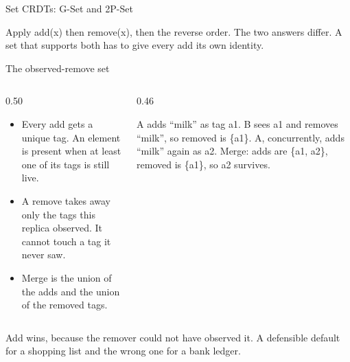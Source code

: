 \documentclass[10pt,aspectratio=169,t]{beamer}
\begin{document}
\begin{frame}[eyebrow=CRDTs]{Set CRDTs: G-Set and 2P-Set}
  \vskip 2mm
  \begin{grid}[3]
  \end{grid}
  \vskip 3mm
  \begin{takeaway}{Apply add(x) then remove(x), then the reverse order.}
    The two answers differ. A set that supports both has to give every add its own identity.
  \end{takeaway}
\end{frame}

\begin{frame}[eyebrow=CRDTs]{The observed-remove set}
  \vskip 3mm
  \begin{columns}[T]
    \begin{column}{0.50\textwidth}
      \begin{itemize}
        \item Every add gets a unique tag. An element is present when at least one of its tags is still live.
        \item A remove takes away only the tags this replica observed. It cannot touch a tag it never saw.
        \item Merge is the union of the adds and the union of the removed tags.
      \end{itemize}
    \end{column}
    \begin{column}{0.46\textwidth}
      \begin{hint}
        A adds ``milk'' as tag a1. B sees a1 and removes ``milk'', so removed is \{a1\}. A, concurrently, adds ``milk'' again as a2. Merge: adds are \{a1, a2\}, removed is \{a1\}, so a2 survives.
      \end{hint}
    \end{column}
  \end{columns}
  \begin{takeaway}{Add wins, because the remover could not have observed it.}
    A defensible default for a shopping list and the wrong one for a bank ledger.
  \end{takeaway}
\end{frame}
\end{document}
